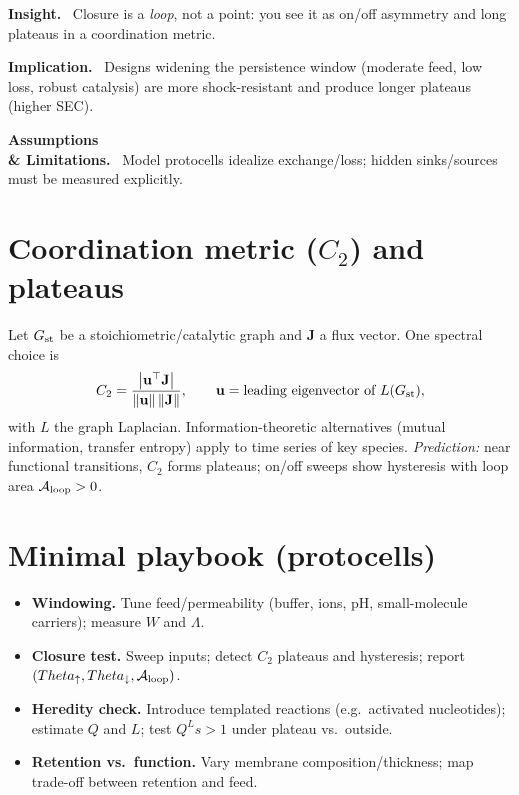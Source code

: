 \documentclass[12pt,a4paper,oneside]{scrreprt}
\def\Theta{Theta}%
\newenvironment{insight}{\par\vspace{0.5em}\noindent\textbf{Insight.}\ }{\par\vspace{0.5em}}
\newenvironment{implication}{\par\vspace{0.5em}\noindent\textbf{Implication.}\ }{\par\vspace{0.5em}}
\newenvironment{limitation}{\par\vspace{0.5em}\noindent\textbf{Assumptions \\ \& Limitations.}\ }{\par\vspace{0.5em}}
\begin{document}
\begin{insight}
Closure is a \emph{loop}, not a point: you see it as on/off asymmetry and long plateaus in a coordination metric.
\end{insight}

\begin{implication}
Designs widening the persistence window (moderate feed, low loss, robust catalysis) are more shock-resistant and produce longer plateaus (higher SEC).
\end{implication}

\begin{limitation}
Model protocells idealize exchange/loss; hidden sinks/sources must be measured explicitly.
\end{limitation}

\section{Coordination metric ($C_2$) and plateaus}\label{sec:life-C2}
Let $G_{\rm st}$ be a stoichiometric/catalytic graph and $\mathbf J$ a flux vector. 
One spectral choice is
\begin{equation}
C_2=\frac{\left|\mathbf u^\top \mathbf J\right|}{\|\mathbf u\|\,\|\mathbf J\|},\qquad 
\mathbf u=\text{leading eigenvector of }L(G_{\rm st}),
\end{equation}
with $L$ the graph Laplacian. 
Information-theoretic alternatives (mutual information, transfer entropy) apply to time series of key species. 
\emph{Prediction:} near functional transitions, $C_2$ forms plateaus; on/off sweeps show hysteresis with loop area $\mathcal A_{\rm loop}>0$.

\section{Minimal playbook (protocells)}\label{sec:life-playbook}
\begin{itemize}
\item \textbf{Windowing.} Tune feed/permeability (buffer, ions, pH, small-molecule carriers); measure $W$ and $\Lambda$.
\item \textbf{Closure test.} Sweep inputs; detect $C_2$ plateaus and hysteresis; report $(\Theta_\uparrow,\Theta_\downarrow,\mathcal A_{\rm loop})$.
\item \textbf{Heredity check.} Introduce templated reactions (e.g.\ activated nucleotides); estimate $Q$ and $L$; test $Q^L s>1$ under plateau vs.\ outside.
\item \textbf{Retention vs.\ function.} Vary membrane composition/thickness; map trade-off between retention and feed.
\end{itemize}
\end{document}
